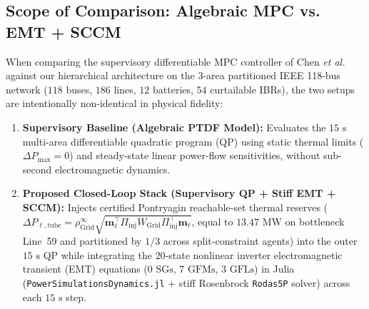 \documentclass[journal]{IEEEtran}
\begin{document}
\subsection{Scope of Comparison: Algebraic MPC vs. EMT + SCCM}
When comparing the supervisory differentiable MPC controller of Chen \textit{et al.} against our hierarchical architecture on the $3$-area partitioned IEEE 118-bus network ($118$ buses, $186$ lines, $12$ batteries, $54$ curtailable IBRs), the two setups are intentionally non-identical in physical fidelity:
\begin{enumerate}
    \item \textbf{Supervisory Baseline (Algebraic PTDF Model):} Evaluates the $15\text{ s}$ multi-area differentiable quadratic program (QP) using static thermal limits ($\Delta P_{\max} = 0$) and steady-state linear power-flow sensitivities, without sub-second electromagnetic dynamics.
    \item \textbf{Proposed Closed-Loop Stack (Supervisory QP + Stiff EMT + SCCM):} Injects certified Pontryagin reachable-set thermal reserves ($\Delta P_{\ell,\text{tube}} = \rho_{\text{Grid}}^\infty \sqrt{\mathbf{m}_\ell^\top \Pi_{\text{inj}} W_{\text{Grid}} \Pi_{\text{inj}}^\top \mathbf{m}_\ell}$, equal to $13.47\text{ MW}$ on bottleneck Line~59 and partitioned by $1/3$ across split-constraint agents) into the outer $15\text{ s}$ QP while integrating the $20$-state nonlinear inverter electromagnetic transient (EMT) equations ($0\text{ SGs}$, $7\text{ GFMs}$, $3\text{ GFLs}$) in Julia (\texttt{PowerSimulationsDynamics.jl} + stiff Rosenbrock \texttt{Rodas5P} solver) across each $15\text{ s}$ step.
\end{enumerate}
\end{document}
